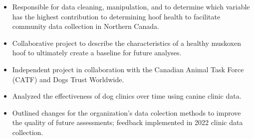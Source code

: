 \documentclass[10pt,a4paper,ragged2e]{altacv}
\begin{document}

\begin{fullwidth}
\makecvheader
\end{fullwidth}




\begin{itemize}
\item Responsible for data cleaning, manipulation, and to determine which variable has the highest contribution to determining hoof health to facilitate community data collection in Northern Canada.
\item Collaborative project to describe the characteristics of a healthy muskoxen hoof to ultimately create a baseline for future analyses.
\end{itemize}
\divider\small

\begin{itemize}
\item Independent project in collaboration with the Canadian Animal Task Force (CATF) and Dogs Trust Worldwide.
\item Analyzed the effectiveness of dog clinics over time using canine clinic data.
\item Outlined changes for the organization's data colection methods to improve the quality of future assessments; feedback implemented in 2022 clinic data collection.
\end{itemize}
\divider\small
\end{document}
